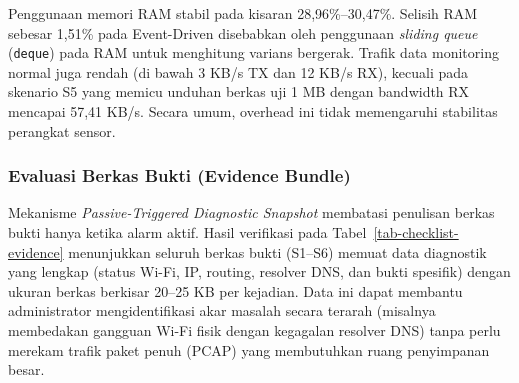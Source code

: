 Penggunaan memori RAM stabil pada kisaran 28,96\%--30,47\%. Selisih RAM sebesar 1,51\% pada Event-Driven disebabkan oleh penggunaan \textit{sliding queue} (\texttt{deque}) pada RAM untuk menghitung varians bergerak. Trafik data monitoring normal juga rendah (di bawah 3 KB/s TX dan 12 KB/s RX), kecuali pada skenario S5 yang memicu unduhan berkas uji 1 MB dengan bandwidth RX mencapai 57,41 KB/s. Secara umum, overhead ini tidak memengaruhi stabilitas perangkat sensor.

\subsubsection{Evaluasi Berkas Bukti (Evidence Bundle)}
Mekanisme \textit{Passive-Triggered Diagnostic Snapshot} membatasi penulisan berkas bukti hanya ketika alarm aktif. Hasil verifikasi pada Tabel~\ref{tab-checklist-evidence} menunjukkan seluruh berkas bukti (S1--S6) memuat data diagnostik yang lengkap (status Wi-Fi, IP, routing, resolver DNS, dan bukti spesifik) dengan ukuran berkas berkisar 20--25 KB per kejadian. Data ini dapat membantu administrator mengidentifikasi akar masalah secara terarah (misalnya membedakan gangguan Wi-Fi fisik dengan kegagalan resolver DNS) tanpa perlu merekam trafik paket penuh (PCAP) yang membutuhkan ruang penyimpanan besar.
